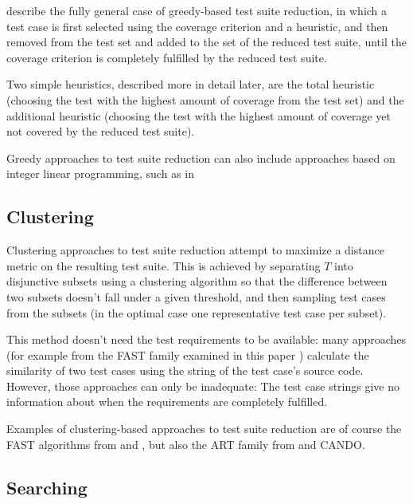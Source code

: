 \cite{khan2018systematic} describe the fully general case of greedy-based
test suite reduction, in which a test case is first selected using
the coverage criterion and a heuristic, and then removed from the test
set and added to the set of the reduced test suite, until the coverage
criterion is completely fulfilled by the reduced test suite.

Two simple heuristics, described more in detail later, are the total
heuristic (choosing the test with the highest amount of coverage from
the test set) and the additional heuristic (choosing the test with the
highest amount of coverage yet not covered by the reduced test suite).

Greedy approaches to test suite reduction can also include approaches
based on integer linear programming, such as in %


\subsection{Clustering}

Clustering approaches to test suite reduction attempt to maximize
a distance metric on the resulting test suite. This is achieved by
separating $T$ into disjunctive subsets using a clustering algorithm
so that the difference between two subsets doesn't fall under a given %
threshold, and then sampling test cases from the subsets (in the optimal
case one representative test case per subset).

This method doesn't need the test requirements to be available: many
approaches (for example from the FAST family examined in this paper
\cite{miranda2018fast}) calculate the similarity of two test cases using
the string of the test case's source code. However, those approaches can
only be inadequate: The test case strings give no information about when
the requirements are completely fulfilled.

Examples of clustering-based approaches to test suite reduction are
of course the FAST algorithms from \cite{cruciani2019scalable}
and \cite{miranda2018fast}, but also the ART family from
\cite{chen2010adaptive} and CANDO.


\subsection{Searching}

